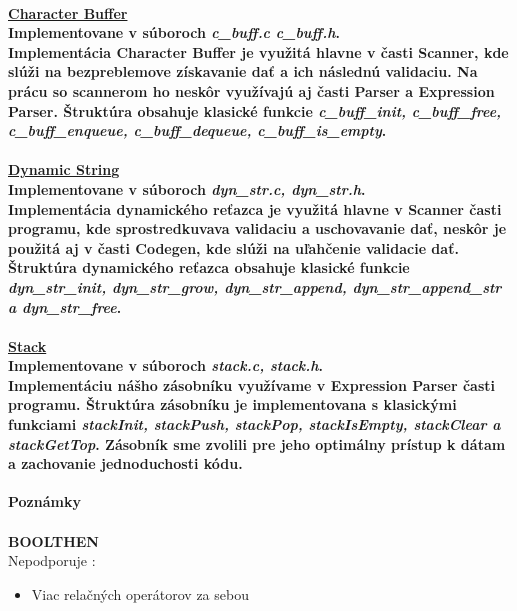 \documentclass[12pt]{article}
\begin{document}
\paragraph{\large \underline{Character Buffer}\normalsize \\ Implementovane v súboroch \textit{c\_buff.c c\_buff.h}. \\ \newline
Implementácia Character Buffer je využitá hlavne v časti Scanner, kde slúži na bezpreblemove získavanie dať a ich následnú validaciu. Na prácu so scannerom ho neskôr využívajú aj časti Parser a Expression Parser. Štruktúra obsahuje klasické funkcie \textit{c\_buff\_init, c\_buff\_free, c\_buff\_enqueue, c\_buff\_dequeue, c\_buff\_is\_empty}. 
\newline \\}

\paragraph{\large \underline{Dynamic String}\normalsize \\ Implementovane v súboroch \textit{dyn\_str.c, dyn\_str.h}. \\ \newline
Implementácia dynamického reťazca je využitá hlavne v Scanner časti programu, kde sprostredkuvava validaciu a uschovavanie dať, neskôr je použitá aj v časti Codegen, kde slúži na uľahčenie validacie dať. Štruktúra dynamického reťazca obsahuje klasické funkcie \textit{dyn\_str\_init, dyn\_str\_grow, dyn\_str\_append, dyn\_str\_append\_str a dyn\_str\_free}.  
\newline \\}

\paragraph{\large \underline{Stack}\normalsize \\ Implementovane v súboroch \textit{stack.c, stack.h}. \\ \newline
Implementáciu nášho zásobníku využívame v Expression Parser časti programu. Štruktúra zásobníku je implementovana s klasickými funkciami \textit{stackInit, stackPush, stackPop, stackIsEmpty, stackClear a stackGetTop}. Zásobník sme zvolili pre jeho optimálny prístup k dátam a zachovanie jednoduchosti kódu.
\newline \\}

\newpage

 \Large \textbf{Poznámky}\normalsize \\
\noindent\makebox[\linewidth]{\rule{\textwidth}{0.4pt}}
\newline \\

\large
\noindent \textbf{BOOLTHEN} \newline \\
Nepodporuje : 
\normalsize
\begin{itemize}
\item Viac relačných operátorov za sebou
\end{itemize}
\medskip
\end{document}
